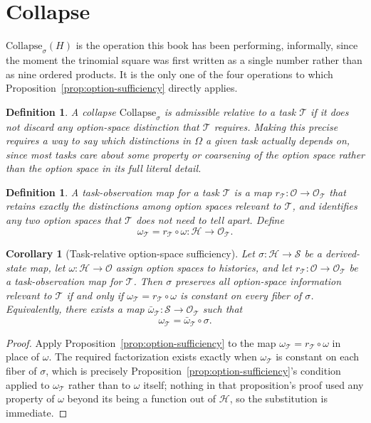 \documentclass[11pt]{book}
\newtheorem{corollary}[theorem]{Corollary}
\newtheorem{definition}[theorem]{Definition}
\begin{document}
\section{Collapse}

$\mathrm{Collapse}_\sigma(H)$ is the operation this book has been performing, informally, since the moment the trinomial square was first written as a single number rather than as nine ordered products. It is the only one of the four operations to which Proposition~\ref{prop:option-sufficiency} directly applies.

\begin{definition}
A collapse $\mathrm{Collapse}_\sigma$ is \emph{admissible relative to a task $\mathcal T$} if it does not discard any option-space distinction that $\mathcal T$ requires. Making this precise requires a way to say which distinctions in $\Omega$ a given task actually depends on, since most tasks care about some property or coarsening of the option space rather than the option space in its full literal detail.
\end{definition}

\begin{definition}
A \emph{task-observation map} for a task $\mathcal T$ is a map $r_{\mathcal T}:\mathcal O \to \mathcal O_{\mathcal T}$ that retains exactly the distinctions among option spaces relevant to $\mathcal T$, and identifies any two option spaces that $\mathcal T$ does not need to tell apart. Define
\[
\omega_{\mathcal T} = r_{\mathcal T}\circ\omega : \mathcal H \to \mathcal O_{\mathcal T}.
\]
\end{definition}

\begin{corollary}[Task-relative option-space sufficiency]
\label{cor:task-sufficiency}
Let $\sigma:\mathcal H\to\mathcal S$ be a derived-state map, let $\omega:\mathcal H\to\mathcal O$ assign option spaces to histories, and let $r_{\mathcal T}:\mathcal O\to\mathcal O_{\mathcal T}$ be a task-observation map for $\mathcal T$. Then $\sigma$ preserves all option-space information relevant to $\mathcal T$ if and only if $\omega_{\mathcal T}=r_{\mathcal T}\circ\omega$ is constant on every fiber of $\sigma$. Equivalently, there exists a map $\bar\omega_{\mathcal T}:\mathcal S\to\mathcal O_{\mathcal T}$ such that
\[
\omega_{\mathcal T} = \bar\omega_{\mathcal T}\circ\sigma.
\]
\end{corollary}
\begin{proof}
Apply Proposition~\ref{prop:option-sufficiency} to the map $\omega_{\mathcal T}=r_{\mathcal T}\circ\omega$ in place of $\omega$. The required factorization exists exactly when $\omega_{\mathcal T}$ is constant on each fiber of $\sigma$, which is precisely Proposition~\ref{prop:option-sufficiency}'s condition applied to $\omega_{\mathcal T}$ rather than to $\omega$ itself; nothing in that proposition's proof used any property of $\omega$ beyond its being a function out of $\mathcal H$, so the substitution is immediate.
\end{proof}
\end{document}
